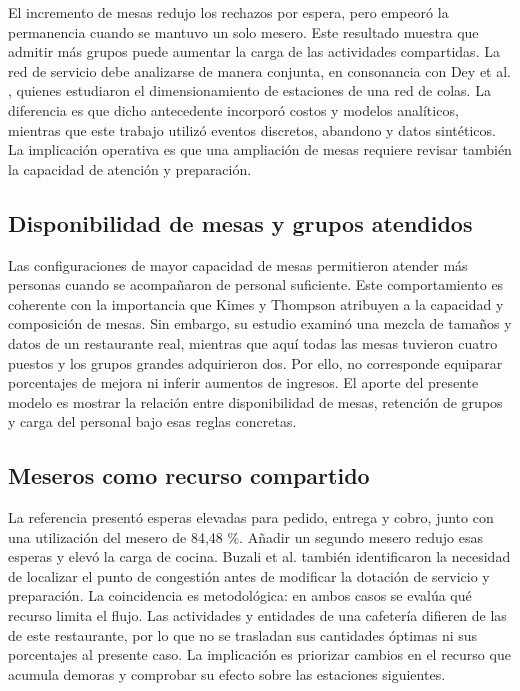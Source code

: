 \documentclass[10pt,a4paper,twocolumn]{article}
\begin{document}
El incremento de mesas redujo los rechazos por espera, pero empeoró la permanencia cuando se mantuvo un solo mesero. Este resultado muestra que admitir más grupos puede aumentar la carga de las actividades compartidas. La red de servicio debe analizarse de manera conjunta, en consonancia con Dey et al. \cite{ref2}, quienes estudiaron el dimensionamiento de estaciones de una red de colas. La diferencia es que dicho antecedente incorporó costos y modelos analíticos, mientras que este trabajo utilizó eventos discretos, abandono y datos sintéticos. La implicación operativa es que una ampliación de mesas requiere revisar también la capacidad de atención y preparación.

\subsection{Disponibilidad de mesas y grupos atendidos}

Las configuraciones de mayor capacidad de mesas permitieron atender más personas cuando se acompañaron de personal suficiente. Este comportamiento es coherente con la importancia que Kimes y Thompson \cite{ref4} atribuyen a la capacidad y composición de mesas. Sin embargo, su estudio examinó una mezcla de tamaños y datos de un restaurante real, mientras que aquí todas las mesas tuvieron cuatro puestos y los grupos grandes adquirieron dos. Por ello, no corresponde equiparar porcentajes de mejora ni inferir aumentos de ingresos. El aporte del presente modelo es mostrar la relación entre disponibilidad de mesas, retención de grupos y carga del personal bajo esas reglas concretas.

\subsection{Meseros como recurso compartido}

La referencia presentó esperas elevadas para pedido, entrega y cobro, junto con una utilización del mesero de 84,48 \%. Añadir un segundo mesero redujo esas esperas y elevó la carga de cocina. Buzali et al. \cite{ref8} también identificaron la necesidad de localizar el punto de congestión antes de modificar la dotación de servicio y preparación. La coincidencia es metodológica: en ambos casos se evalúa qué recurso limita el flujo. Las actividades y entidades de una cafetería difieren de las de este restaurante, por lo que no se trasladan sus cantidades óptimas ni sus porcentajes al presente caso. La implicación es priorizar cambios en el recurso que acumula demoras y comprobar su efecto sobre las estaciones siguientes.
\end{document}
